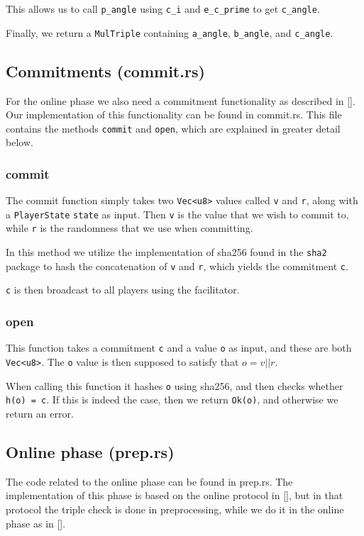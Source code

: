 \documentclass[../main.tex]{subfiles}
\begin{document}
This allows us to call \lstinline{p_angle} using \lstinline{c_i} and \lstinline{e_c_prime} to get \lstinline{c_angle}.

Finally, we return a \lstinline{MulTriple} containing \lstinline{a_angle}, \lstinline{b_angle}, and \lstinline{c_angle}.

\subsection{Commitments (commit.rs)}
For the online phase we also need a commitment functionality as described in [].
Our implementation of this functionality can be found in commit.rs. This file contains the methods \lstinline{commit} and \lstinline{open}, which are explained in greater detail below.

\subsubsection{commit}
The commit function simply takes two \lstinline{Vec<u8>} values called \lstinline{v} and \lstinline{r}, along with a \lstinline{PlayerState} \lstinline{state} as input. Then \lstinline{v} is the value that we wish to commit to, while \lstinline{r} is the randomness that we use when committing.

In this method we utilize the implementation of sha256 found in the \lstinline{sha2} package to hash the concatenation of \lstinline{v} and \lstinline{r}, which yields the commitment \lstinline{c}.

\lstinline{c} is then broadcast to all players using the facilitator.

\subsubsection{open}
This function takes a commitment \lstinline{c} and a value \lstinline{o} as input, and these are both \lstinline{Vec<u8>}. The \lstinline{o} value is then supposed to satisfy that $o = v || r$.

When calling this function it hashes \lstinline{o} using sha256, and then checks whether \lstinline{h(o) = c}. If this is indeed the case, then we return \lstinline{Ok(o)}, and otherwise we return an error.

\subsection{Online phase (prep.rs)}
The code related to the online phase can be found in prep.rs. The implementation of this phase is based on the online protocol in [], but in that protocol the triple check is done in preprocessing, while we do it in the online phase as in [].
\end{document}
